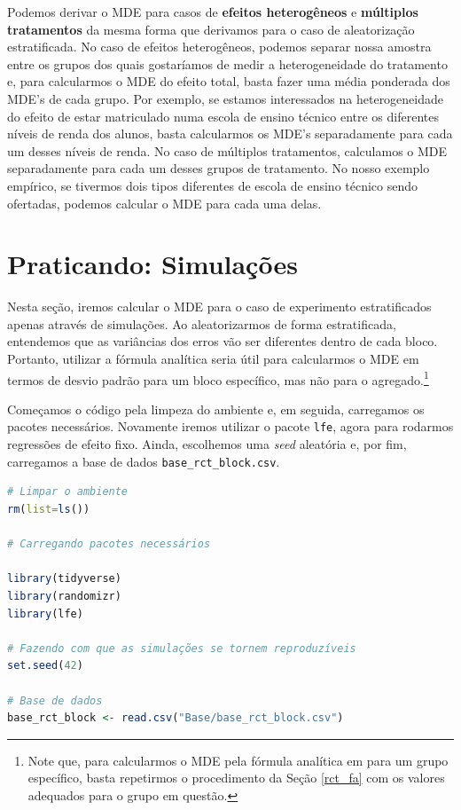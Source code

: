 Podemos derivar o MDE para casos de \textbf{efeitos heterogêneos} e \textbf{múltiplos tratamentos} da mesma forma que derivamos para o caso de aleatorização estratificada. No caso de efeitos heterogêneos, podemos separar nossa amostra entre os grupos dos quais gostaríamos de medir a heterogeneidade do tratamento e, para calcularmos o MDE do efeito total, basta fazer uma média ponderada dos MDE's de cada grupo. Por exemplo, se estamos interessados na heterogeneidade do efeito de estar matriculado numa escola de ensino técnico entre os diferentes níveis de renda dos alunos, basta calcularmos os MDE's separadamente para cada um desses níveis de renda. No caso de múltiplos tratamentos, calculamos o MDE separadamente para cada um desses grupos de tratamento. No nosso exemplo empírico, se tivermos dois tipos diferentes de escola de ensino técnico sendo ofertadas, podemos calcular o MDE para cada uma delas. 

\section{Praticando: Simulações}

Nesta seção, iremos calcular o MDE para o caso de experimento estratificados apenas através de simulações. Ao aleatorizarmos de forma estratificada, entendemos que as variâncias dos erros vão ser diferentes dentro de cada bloco. Portanto, utilizar a fórmula analítica seria útil para calcularmos o MDE em termos de desvio padrão para um bloco específico, mas não para o agregado.\footnote{Note que, para calcularmos o MDE pela fórmula analítica em para um grupo específico, basta repetirmos o procedimento da Seção \ref{rct_fa} com os valores adequados para o grupo em questão.}

Começamos o código pela limpeza do ambiente e, em seguida, carregamos os pacotes necessários. Novamente iremos utilizar o pacote \texttt{lfe}, agora para rodarmos regressões de efeito fixo. Ainda, escolhemos uma \textit{seed} aleatória e, por fim, carregamos a base de dados \texttt{base\_rct\_block.csv}.

\begin{boxH}
\begin{lstlisting}[language = R]
# Limpar o ambiente 
rm(list=ls())

# Carregando pacotes necessários

library(tidyverse)
library(randomizr)
library(lfe)

# Fazendo com que as simulações se tornem reproduzíveis
set.seed(42)

# Base de dados
base_rct_block <- read.csv("Base/base_rct_block.csv")
\end{lstlisting}
\end{boxH}

